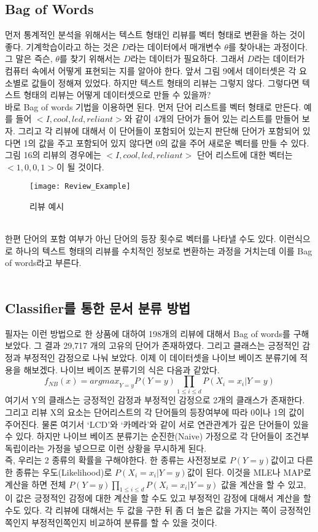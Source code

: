 \documentclass[a4paper]{oblivoir}
\begin{document}
\subsection{Bag of Words}
먼저 통계적인 분석을 위해서는 텍스트 형태인 리뷰를 벡터 형태로 변환을 하는 것이 좋다. 기계학습이라고 하는 것은 $D$라는 데이터에서 매개변수 $\theta$를 찾아내는 과정이다. 그 말은 즉슨, $\theta$를 찾기 위해서는 $D$라는 데이터가 필요하다. 그래서 $D$라는 데이터가 컴퓨터 속에서 어떻게 표현되는 지를 알아야 한다. 앞서 그림 9에서 데이터셋은 각 요소별로 값들이 정해져 있었다. 하지만 텍스트 형태의 리뷰는 그렇지 않다. 그렇다면 텍스트 형태의 리뷰는 어떻게 데이터셋으로 만들 수 있을까?\\
\indent 바로 Bag of words 기법을 이용하면 된다. 먼저 단어 리스트를 벡터 형태로 만든다. 예를 들어 $<I, cool, led, reliant>$와 같이 4개의 단어가 들어 있는 리스트를 만들어 보자. 그리고 각 리뷰에 대해서 이 단어들이 포함되어 있는지 판단해 단어가 포함되어 있다면 1의 값을 주고 포함되어 있지 않다면 0의 값을 주어 새로운 벡터를 만들 수 있다. 그림 16의 리뷰의 경우에는 $<I, cool, led, reliant>$ 단어 리스트에 대한 벡터는 $<1,0,0,1>$이 될 것이다.
\begin{figure}[ht]\centering
\texttt{[image: Review\_Example]}\caption{리뷰 예시}\label{Fig:3-16}
\end{figure}\\
\indent 한편 단어의 포함 여부가 아닌 단어의 등장 횟수로 벡터를 나타낼 수도 있다. 이런식으로 하나의 텍스트 형태의 리뷰를 수치적인 정보로  변환하는 과정을 거치는데 이를 Bag of words라고 부른다.\\\\

\subsection{Classifier를 통한 문서 분류 방법}
\indent 필자는 이런 방법으로 한 상품에 대하여 198개의 리뷰에 대해서 Bag of words를 구해보았다. 그 결과 29,717 개의 고유의 단어가 존재하였다. 그리고 클래스는 긍정적인 감정과 부정적인 감정으로 나눠 보았다. 이제 이 데이터셋을 나이브 베이즈 분류기에 적용을 해보겠다. 나이브 베이즈 분류기의 식은 다음과 같았다.
$$f_{NB}(x)={argmax}_{Y=y}P(Y=y)\prod_{1\leq i \leq d}P(X_i=x_i|Y=y)$$
여기서 Y의 클래스는 긍정적인 감정과 부정적인 감정으로 2개의 클래스가 존재한다. 그리고 리뷰 X의 요소는 단어리스트의 각 단어들의 등장여부에 따라 0이나 1의 값이 주어진다. 물론 여기서 `LCD'와 `카메라'와 같이 서로 연관관계가 깊은 단어들이 있을 수 있다. 하지만 나이브 베이즈 분류기는 순진한(Naive) 가정으로 각 단어들이 조건부 독립이라는 가정을 넣으므로 이런 상황을 무시하게 된다.\\
\indent 즉, 우리는 2 종류의 확률을 구해야한다. 한 종류는 사전정보로 $P(Y=y)$값이고 다른 한 종류는 우도(Likelihood)로 $P(X_i=x_i|Y=y)$값이 된다. 이것을 MLE나 MAP로 계산을 하면 전체 $P(Y=y)\prod_{1\leq i \leq d}P(X_i=x_i|Y=y)$ 값을 계산을 할 수 있고, 이 값은 긍정적인 감정에 대한 계산을 할 수도 있고 부정적인 감정에 대해서 계산을 할 수도 있다. 각 리뷰에 대해서는 두 값을 구한 뒤 좀 더 높은 값을 가지는 쪽이 긍정적인쪽인지 부정적인쪽인지 비교하여 분류를 할 수 있을 것이다.\\
\end{document}
